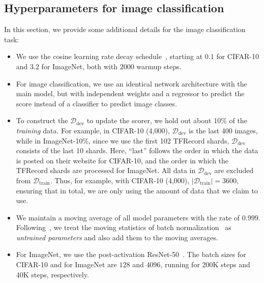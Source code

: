 \subsection{\label{app:image_hparam} Hyperparameters for image classification}
In this section, we provide some additional details for the image classification task:
\begin{itemize}
  \item We use the cosine learning rate decay schedule~\citep{cosine_lr}, starting at $0.1$ for CIFAR-10 and $3.2$ for ImageNet, both with $2000$ warmup steps. 
  \item For image classification, we use an identical network architecture with the main model, but with independent weights and a regressor to predict the score instead of a classifier to predict image classes.
  \item To construct the $\mathcal{D}_\text{dev}$ to update the scorer, we hold out about 10\% of the \textit{training} data. For example, in CIFAR-10 (4,000), $\mathcal{D}_\text{dev}$ is the last 400 images, while in ImageNet-10\%, since we use the first 102 TFRecord shards, $\mathcal{D}_\text{dev}$ consists of the last 10 shards. Here, “last” follows the order in which the data is posted on their website for CIFAR-10, and the order in which the TFRecord shards are processed for ImageNet. All data in $\mathcal{D}_\text{dev}$ are excluded from $\mathcal{D}_\text{train}$. Thus, for example, with CIFAR-10 (4,000), $|\mathcal{D}_\text{train}| = 3600$, ensuring that in total, we are only using the amount of data that we claim to use.

  \item We maintain a moving average of all model parameters with the rate of $0.999$. Following~\citet{imagenet_generalize_better}, we treat the moving statistics of batch normalization~\citep{batch_norm} as \textit{untrained parameters} and also add them to the moving averages. 
  \item  For ImageNet, we use the post-activation ResNet-50~\citep{res_net}. 
The batch sizes for CIFAR-10 and for ImageNet are $128$ and $4096$, running for 200K steps and 40K steps, respectively. 
\end{itemize}

